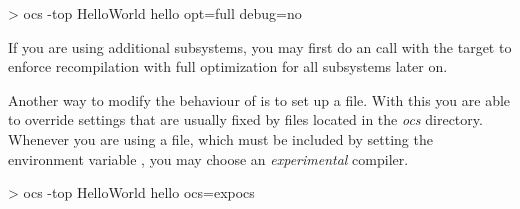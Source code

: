 \begin{prog}
> ocs -top HelloWorld hello opt=full debug=no
\end{prog}

If you are using additional subsystems, you may first do an 
call with the  target to enforce recompilation with
full optimization for all subsystems later on. 



Another way to modify the behaviour of  is to set up a
 file. With this you are able to override settings that
are usually fixed by files located in the {\it ocs\/}
directory. Whenever you are using a  file,
which must be 
included by setting the environment variable , you may
choose an {\em experimental} compiler.  

\begin{prog}
> ocs -top HelloWorld hello ocs=expocs
\end{prog}

